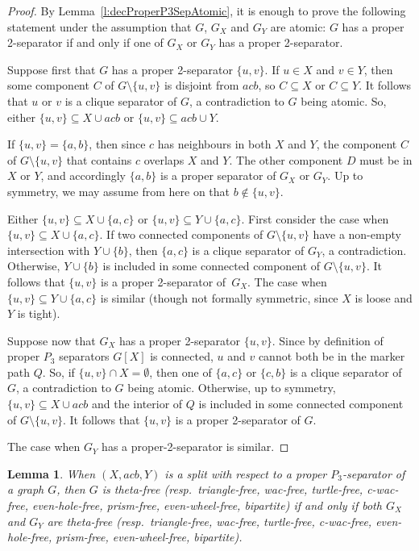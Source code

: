 \documentclass[11pt]{article}
\newtheorem{lemma}[theo]{Lemma}
\newcommand{\sm}{\setminus}
\begin{document}
\begin{proof}
  By Lemma~\ref{l:decProperP3SepAtomic}, it is enough to prove the following statement under the assumption that $G$, $G_X$ and $G_Y$ are atomic: $G$ has a proper 2-separator if and only if one of $G_X$ or $G_Y$ has a proper 2-separator.

  Suppose first that $G$ has a proper 2-separator $\{u, v\}$.  If $u\in X$ and $v\in Y$, then some component $C$ of $G\sm \{u, v\}$ is disjoint from $acb$, so $C\subseteq X$ or $C\subseteq Y$.  It follows that $u$ or $v$ is a clique separator of $G$, a contradiction to $G$ being atomic.  So, either $\{u, v\} \subseteq X \cup acb$ or $\{u, v\} \subseteq  acb \cup Y$. 
  
  If $\{u, v\} = \{a, b\}$, then since $c$ has neighbours in both $X$ and $Y$, the component $C$ of $G\sm \{u, v\}$ that contains $c$ overlaps $X$ and $Y$. The other component $D$ must be in $X$ or $Y$, and accordingly $\{a, b\}$ is a proper separator of $G_X$ or $G_Y$. Up to symmetry, we may assume from here on that $b\notin \{u, v\}$. 
  
  
  Either $\{u, v\} \subseteq X \cup \{a, c\}$ or $\{u, v\} \subseteq Y \cup \{a, c\}$.  
  First consider the case when $\{u, v\}\subseteq X \cup \{a, c\}$. 
  If two connected components of $G\sm \{u, v\}$ have a non-empty intersection with $Y\cup \{b\}$, then $\{a, c\}$ is a  clique separator of $G_Y$, a contradiction.  
  Otherwise, $Y\cup \{b\}$ is included in some connected component of $G\sm \{u, v\}$.   
  It follows that $\{u, v\}$ is a proper 2-separator of~$G_X$.  
  The case when $ \{u, v\} \subseteq Y \cup \{a, c\}$ is similar (though not formally symmetric, since $X$ is loose and $Y$ is tight).
  

  Suppose now that  $G_X$ has a proper 2-separator $\{u, v\}$.  Since by definition of proper $P_3$ separators $G[X]$ is connected, $u$ and $v$ cannot both be in the marker path $Q$. 
  So, if $\{u, v\} \cap X = \emptyset$, then one of $\{a, c\}$ or $\{c, b\}$ is a clique separator of $G$, a contradiction to $G$ being atomic. 
  Otherwise, up to symmetry, $\{u, v\}\subseteq X\cup acb$ and the interior of $Q$ is included in some connected component of $G\sm \{u, v\}$. It follows that $\{u, v\}$ is a proper 2-separator of $G$.
  
  The case when $G_Y$ has a proper-2-separator is similar.  
\end{proof}



\begin{lemma}
  \label{l:decProperP3Sep}
  When $(X, acb, Y)$ is a split with respect to a proper $P_3$-separator of a graph $G$, then $G$ is theta-free (resp.\ triangle-free, wac-free, turtle-free, c-wac-free, even-hole-free, prism-free, even-wheel-free, bipartite) if and only if both $G_X$ and $G_Y$ are theta-free (resp.\ triangle-free, wac-free, turtle-free, c-wac-free, even-hole-free, prism-free, even-wheel-free, bipartite).
\end{lemma}
\end{document}
